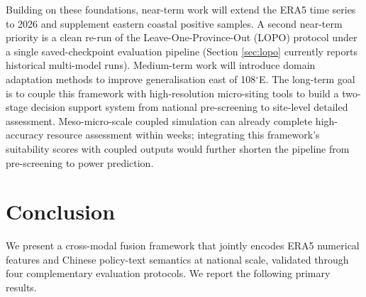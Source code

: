 \documentclass[12pt, a4paper]{article}
\begin{document}
Building on these foundations, near-term work will extend the
ERA5 time series to 2026 and supplement eastern coastal
positive samples. A second near-term priority is a clean
re-run of the Leave-One-Province-Out (LOPO) protocol under
a single saved-checkpoint evaluation pipeline (Section
\ref{sec:lopo} currently reports historical multi-model
runs). Medium-term work will introduce domain adaptation
methods to improve generalisation east of 108$^\circ$E.
The long-term goal is to couple this framework with
high-resolution micro-siting tools to build a two-stage
decision support system from national pre-screening to
site-level detailed assessment. Meso-micro-scale coupled
simulation can already complete high-accuracy resource
assessment within weeks; integrating this framework's
suitability scores with coupled outputs would further
shorten the pipeline from pre-screening to power
prediction.

\section{Conclusion}

We present a cross-modal fusion framework that jointly
encodes ERA5 numerical features and Chinese policy-text
semantics at national scale, validated through four
complementary evaluation protocols. We report the
following primary results.
\end{document}
